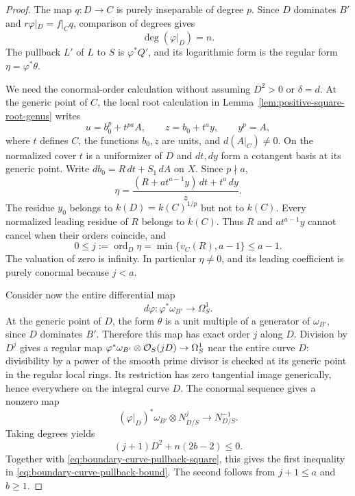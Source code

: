 \begin{proof}
The map $q:D\to C$ is purely inseparable of degree $p$.  Since $D$
dominates $B'$ and $r\varphi|_D=f|_Cq$, comparison of degrees gives
\[
 \deg(\varphi|_D)=n.
\]
The pullback $L'$ of $L$ to $S$ is $\varphi^*Q'$, and its logarithmic
form is the regular form $\eta=\varphi^*\theta$.

We need the conormal-order calculation without assuming
$D^2>0$ or $\delta=d$.  At the generic point of $C$, the local
root calculation in Lemma~\ref{lem:positive-square-root-genus}
writes
\[
 u=b_0^p+t^{pa}A,\qquad z=b_0+t^ay,\qquad y^p=A,
\]
where $t$ defines $C$, the functions $b_0,z$ are units, and
$d(A|_C)\ne0$.  On the normalized cover $t$ is a uniformizer of
$D$ and $dt,dy$ form a cotangent basis at its generic point.
Write $db_0=R\,dt+S_1\,dA$ on $X$.  Since $p\nmid a$,
\begin{equation}\label{eq:boundary-curve-pullback-differential}
 \eta=\frac{(R+a t^{a-1}y)\,dt+t^a\,dy}{z}.
\end{equation}
The residue $y_0$ belongs to $k(D)=k(C)^{1/p}$ but not to $k(C)$.
Every normalized leading residue of $R$ belongs to $k(C)$.
Thus $R$ and $a t^{a-1}y$ cannot cancel when their orders coincide,
and
\[
 0\leq j:=\operatorname{ord}_D\eta
     =\min\{v_C(R),a-1\}\leq a-1.
\]
The valuation of zero is infinity.  In particular $\eta\ne0$, and
its leading coefficient is purely conormal because $j<a$.

Consider now the entire differential map
\[
 d\varphi:\varphi^*\omega_{B'}\longrightarrow\Omega_S^1.
\]
At the generic point of $D$, the form $\theta$ is a unit multiple
of a generator of $\omega_{B'}$, since $D$ dominates $B'$.
Therefore this map has exact order $j$ along $D$.
Division by $D^j$ gives a regular map
$\varphi^*\omega_{B'}\otimes\mathcal O_S(jD)\to\Omega_S^1$
near the entire curve $D$: divisibility by a power of the smooth
prime divisor is checked at its generic point in the regular local
rings.  Its restriction has zero tangential image generically,
hence everywhere on the integral curve $D$.  The conormal sequence
gives a nonzero map
\begin{equation}\label{eq:boundary-curve-pullback-conormal}
 (\varphi|_D)^*\omega_{B'}\otimes N_{D/S}^{j}
       \longrightarrow N_{D/S}^{-1}.
\end{equation}
Taking degrees yields
\[
 (j+1)D^2+n(2b-2)\leq0.
\]
Together with \eqref{eq:boundary-curve-pullback-square}, this gives
the first inequality in \eqref{eq:boundary-curve-pullback-bound}.
The second follows from $j+1\leq a$ and $b\geq1$.
\end{proof}

